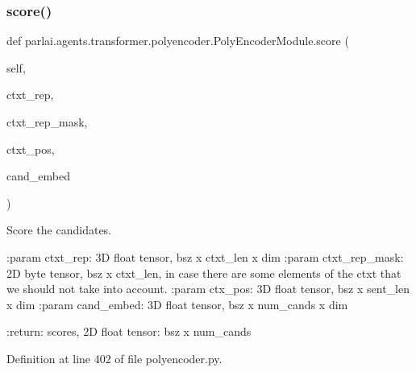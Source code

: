 \subsubsection{\texorpdfstring{score()}{score()}}
{\footnotesize\ttfamily def parlai.\+agents.\+transformer.\+polyencoder.\+Poly\+Encoder\+Module.\+score (\begin{DoxyParamCaption}\item[{}]{self,  }\item[{}]{ctxt\+\_\+rep,  }\item[{}]{ctxt\+\_\+rep\+\_\+mask,  }\item[{}]{ctxt\+\_\+pos,  }\item[{}]{cand\+\_\+embed }\end{DoxyParamCaption})}

\begin{DoxyVerb}Score the candidates.

:param ctxt_rep:
    3D float tensor, bsz x ctxt_len x dim
:param ctxt_rep_mask:
    2D byte tensor, bsz x ctxt_len, in case there are some elements
    of the ctxt that we should not take into account.
:param ctx_pos: 3D float tensor, bsz x sent_len x dim
:param cand_embed: 3D float tensor, bsz x num_cands x dim

:return: scores, 2D float tensor: bsz x num_cands
\end{DoxyVerb}
 

Definition at line 402 of file polyencoder.\+py.


